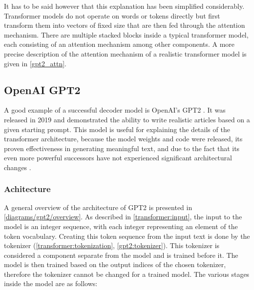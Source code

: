 It has to be said however that this explanation has been simplified considerably. Transformer models do not operate on words or tokens directly but first transform them into vectors of fixed size that are then fed through the attention mechanism. There are multiple stacked blocks inside a typical transformer model, each consisting of an attention mechanism among other components. A more precise description of the attention mechanism of a realistic transformer model is given in \cref{gpt2_attn}.

\subsection{OpenAI GPT2}

A good example of a successful decoder model is OpenAI's GPT2 \cite{unsupervisedmultitask} \cite{OpenAI2019BetterLM} \cite[source code]{HuggingFaceGPT2}. It was released in 2019 and demonstrated the ability to write realistic articles based on a given starting prompt. This model is useful for explaining the details of the transformer architecture, because the model weights and code were released, its proven effectiveness in generating meaningful text, and due to the fact that its even more powerful successors have not experienced significant architectural changes \cite{OpenGenus2023GPTComparison}.

\subsubsection{Achitecture}

A general overview of the architecture of GPT2 is presented in \cref{diagrams/gpt2/overview}.
As described in \cref{transformer:input}, the input to the model is an integer sequence, with each integer representing an element of the token vocabulary.
Creating this token sequence from the input text is done by the tokenizer (\cref{transformer:tokenization}, \cref{gpt2:tokenizer}). This tokenizer is considered a component separate from the model and is trained before it. The model is then trained based on the output indices of the chosen tokenizer, therefore the tokenizer cannot be changed for a trained model. The various stages inside the model are as follows:

